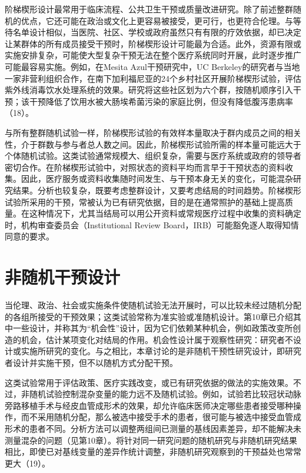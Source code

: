 阶梯楔形设计最常用于临床流程、公共卫生干预或质量改进研究。除了前述整群随机的优点，它还可能在政治或文化上更容易被接受，更可行，也更符合伦理。与等待名单设计相似，当医院、社区、学校或政府虽然只有有限的疗效依据，却已决定让某群体的所有成员接受干预时，阶梯楔形设计可能最为合适。此外，资源有限或实施安排复杂，可能使大型复杂干预无法在整个医疗系统同时开展，此时逐步推广可能最容易实施。例如，在Mesita Azul干预研究中，UC Berkeley的研究者与当地一家非营利组织合作，在南下加利福尼亚的24个乡村社区开展阶梯楔形试验，评估紫外线消毒饮水处理系统的效果。研究将这些社区划为六个群，按随机顺序引入干预；该干预降低了饮用水被大肠埃希菌污染的家庭比例，但没有降低腹泻患病率（18）。

与所有整群随机试验一样，阶梯楔形试验的有效样本量取决于群内成员之间的相关性，介于群数与参与者总人数之间。因此，阶梯楔形试验所需的样本量可能远大于个体随机试验。这类试验通常规模大、组织复杂，需要与医疗系统或政府的领导者密切合作。在阶梯楔形试验中，对照状态的资料平均而言早于干预状态的资料收集。因此，医疗服务或资料收集随时间发生、与干预本身无关的变化，可能混杂研究结果。分析也较复杂，既要考虑整群设计，又要考虑结局的时间趋势。阶梯楔形试验所采用的干预，常被认为已有研究依据，目的是在通常照护的基础上提高质量。在这种情况下，尤其当结局可以用公开资料或常规医疗过程中收集的资料确定时，机构审查委员会（Institutional Review Board，IRB）可能豁免逐人取得知情同意的要求。

\section{非随机干预设计}
当伦理、政治、社会或实施条件使随机试验无法开展时，可以比较未经过随机分配的各组所接受的干预效果；这类试验常称为准实验或准随机设计。第10章已介绍其中一些设计，并称其为“机会性”设计，因为它们依赖某种机会，例如政策改变所创造的机会，估计某项变化对结局的作用。机会性设计属于观察性研究：研究者不设计或实施所研究的变化。与之相比，本章讨论的是非随机干预性研究设计，即研究者设计并实施干预，但不以随机方式分配干预。

这类试验常用于评估政策、医疗实践改变，或已有研究依据的做法的实施效果。不过，非随机试验控制混杂变量的能力远不及随机试验。例如，试验若比较冠状动脉旁路移植手术与经皮血管成形术的效果，却允许临床医师决定哪些患者接受哪种操作，而不采用随机分配，那么被选中接受手术的患者，很可能与被选中接受血管成形术的患者不同。分析方法可以调整两组间已测量的基线因素差异，却不能解决未测量混杂的问题（见第10章）。将针对同一研究问题的随机研究与非随机研究结果相比，即使已对基线变量的差异作统计调整，非随机研究观察到的干预益处也常常更大（19）。


